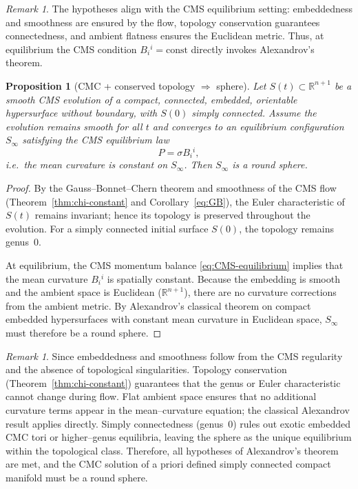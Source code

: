 \documentclass[11pt]{article}
\theoremstyle{definition}
\theoremstyle{plain}
\newtheorem{proposition}[definition]{Proposition}
\theoremstyle{remark}
\newtheorem{remark}[definition]{Remark}
\begin{document}
\begin{remark}
The hypotheses align with the CMS equilibrium setting: embeddedness and smoothness are ensured by the flow, topology conservation guarantees connectedness, and ambient flatness ensures the Euclidean metric. Thus, at equilibrium the CMS condition $B_i{}^{i}=\text{const}$ directly invokes Alexandrov’s theorem.
\end{remark}

\begin{proposition}[CMC + conserved topology $\Rightarrow$ sphere]\label{prop:CMC-to-sphere}
Let $S(t)\subset\mathbb{R}^{n+1}$ be a smooth CMS evolution of a compact, connected, embedded, orientable hypersurface without boundary, with $S(0)$ simply connected.  
Assume the evolution remains smooth for all $t$ and converges to an equilibrium configuration $S_\infty$ satisfying the CMS equilibrium law
\begin{equation}\label{eq:CMS-equilibrium}
P=\sigma B_i{}^{i},
\end{equation}
i.e.\ the mean curvature is constant on $S_\infty$.  
Then $S_\infty$ is a round sphere.
\end{proposition}

\begin{proof}
By the Gauss--Bonnet--Chern theorem and smoothness of the CMS flow (Theorem~\ref{thm:chi-constant} and Corollary~\ref{eq:GB}), the Euler characteristic of $S(t)$ remains invariant; hence its topology is preserved throughout the evolution.  
For a simply connected initial surface $S(0)$, the topology remains genus~$0$.  

At equilibrium, the CMS momentum balance \eqref{eq:CMS-equilibrium} implies that the mean curvature $B_i{}^{i}$ is spatially constant.  
Because the embedding is smooth and the ambient space is Euclidean ($\mathbb{R}^{n+1}$), there are no curvature corrections from the ambient metric.  
By Alexandrov’s classical theorem on compact embedded hypersurfaces with constant mean curvature in Euclidean space, $S_\infty$ must therefore be a round sphere.  
\end{proof}

\begin{remark}
Since embeddedness and smoothness follow from the CMS regularity and the absence of topological singularities. Topology conservation (Theorem~\ref{thm:chi-constant}) guarantees that the genus or Euler characteristic cannot change during flow. Flat ambient space ensures that no additional curvature terms appear in the mean–curvature equation; the classical Alexandrov result applies directly. Simply connectedness (genus~0) rules out exotic embedded CMC tori or higher–genus equilibria, leaving the sphere as the unique equilibrium within the topological class.
Therefore, all hypotheses of Alexandrov’s theorem are met, and the CMC solution of a priori defined simply connected compact manifold must be a round sphere.
\end{remark}
\end{document}
